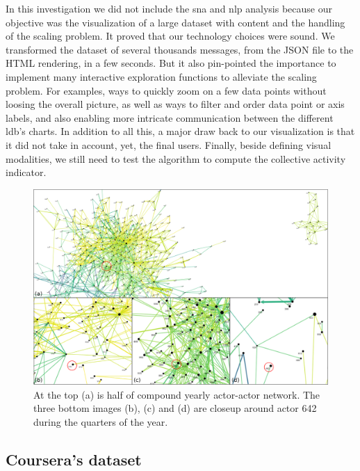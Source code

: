 \documentclass[a4paper,twoside]{article}
\begin{document}
In this investigation we did not include the \gls{sna} and \gls{nlp} analysis because our objective was the visualization of a large dataset with content and the handling of the scaling problem.  It proved that our technology choices were sound. We transformed the dataset of several thousands messages,  from the JSON file to the HTML rendering, in a few seconds.
But it also pin-pointed the importance to implement many interactive exploration functions to alleviate the scaling problem.  For examples, ways to quickly zoom on a few data points without loosing the overall picture, as well as ways to filter and order data point or axis labels, and also enabling more intricate communication between the different \gls{ldb}'s charts.
In addition to all this, a major draw back to our visualization is that it did not take in account, yet, the final users.
Finally, beside defining visual modalities, we still need to test the algorithm to compute the collective activity indicator.

\begin{figure}[t]
  \centering
  \includegraphics[width=\textwidth]{images/evolution.png}
  \small{
    \caption{\label{fig:evolution}
      At the top (a) is half of compound yearly actor-actor network.  The three bottom images (b), (c) and (d) are closeup around actor 642 during the quarters of the year. }}
\end{figure}

\subsection{Coursera's dataset}
\end{document}
